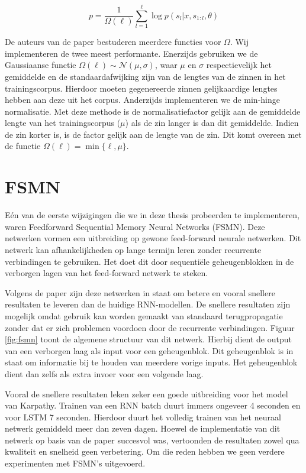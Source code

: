 \begin{equation}
p = \frac{1}{\Omega(\ell)}\sum_{l=1}^{\ell} \log p(s_l | x, s_{1:l}, \theta)
\label{eq:log-sentence-norm}
\end{equation}

De auteurs van de paper bestuderen meerdere functies voor $\Omega$. Wij implementeren de twee meest performante.
Enerzijds gebruiken we de Gaussiaanse functie $\Omega(\ell) \sim \mathcal{N}(\mu, \sigma)$, waar $\mu$ en $\sigma$ respectievelijk het gemiddelde en de standaardafwijking zijn van de lengtes van de zinnen in het trainingscorpus. Hierdoor moeten gegenereerde zinnen gelijkaardige lengtes hebben aan deze uit het corpus.
Anderzijds implementeren we de min-hinge normalisatie. Met deze methode is de normalisatiefactor gelijk aan de gemiddelde lengte van het trainingscorpus ($\mu$) als de zin langer is dan dit gemiddelde. Indien de zin korter is, is de factor gelijk aan de lengte van de zin. Dit komt overeen met de functie $\Omega(\ell)=\min\{\ell, \mu\}$.

\section{FSMN}
E\'en van de eerste wijzigingen die we in deze thesis probeerden te implementeren, waren Feedforward Sequential Memory Neural Networks (FSMN)\cite{Zhang}. Deze netwerken vormen een uitbreiding op gewone feed-forward neurale netwerken. Dit netwerk kan afhankelijkheden op lange termijn leren zonder recurrente verbindingen te gebruiken. Het doet dit door sequenti\"ele geheugenblokken in de verborgen lagen van het feed-forward netwerk te steken. 

Volgens de paper zijn deze netwerken in staat om betere en vooral snellere resultaten te leveren dan de huidige RNN-modellen. De snellere resultaten zijn mogelijk omdat gebruik kan worden gemaakt van standaard terugpropagatie zonder dat er zich problemen voordoen door de recurrente verbindingen. Figuur \ref{fig:fsmn} toont de  algemene structuur van dit netwerk. Hierbij dient de output van een verborgen laag als input voor een geheugenblok. Dit geheugenblok is in staat om informatie bij te houden van meerdere vorige inputs. Het geheugenblok dient dan zelfs als extra invoer voor een volgende laag.

Vooral de snellere resultaten leken zeker een goede uitbreiding voor het model van Karpathy. Trainen van een RNN batch duurt immers ongeveer 4 seconden en voor LSTM 7 seconden. Hierdoor duurt het volledig trainen van het neuraal netwerk gemiddeld meer dan zeven dagen.
Hoewel de implementatie van dit netwerk op basis van de paper succesvol was, vertoonden de resultaten zowel qua kwaliteit en snelheid geen verbetering. Om die reden hebben we geen verdere experimenten met FSMN's uitgevoerd.

